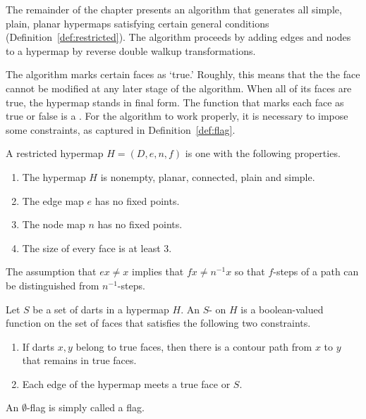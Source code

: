 The remainder of the chapter presents an algorithm that generates all
simple, plain, planar hypermaps satisfying certain general conditions
(Definition~\ref{def:restricted}).  The algorithm proceeds by adding
edges and nodes to a hypermap by reverse double walkup
transformations.

The algorithm  marks certain faces as `true.'
Roughly, this  means that the the face cannot be modified
at any later stage of the algorithm.   When all of its faces
are true, the hypermap stands in final form.
The function that marks each face as true or false is a
.  For the algorithm to work properly, it is necessary
to impose some constraints, as captured in Definition~\ref{def:flag}.
%

\begin{definition}[restricted]\label{def:restricted}
A restricted hypermap $H = (D,e,n,f)$ is one with the following
properties.
\begin{enumerate}
\item The hypermap $H$ is nonempty, planar, connected, plain and simple.
\item The edge map $e$ has no fixed points.  %
\item The node map $n$ has no fixed points.
\item The size of every face is at least $3$.
\end{enumerate}
%
%
\end{definition}

\begin{remark}
The assumption that $e x \ne x$ implies that $f x \ne n^{-1} x$ so that $f$-steps of a 
path can be distinguished from $n^{-1}$-steps.
\end{remark}

\begin{definition}[flag]\label{def:flag} 
Let $S$ be a set of darts in a hypermap $H$.  An
$S$- on $H$ is a boolean-valued function on the set of faces that satisfies
the following two constraints. 
\begin{enumerate}
\item If darts $x,y$ belong to true faces,
then there is a contour path from $x$ to $y$ that remains
in true faces.
\item Each edge of the hypermap meets a true face or $S$.
\end{enumerate}
An $\emptyset$-flag is simply called a flag.
%
%
\end{definition}



